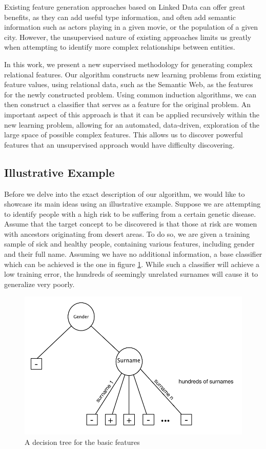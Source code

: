 \documentclass[twoside,11pt]{article}
\theoremstyle{definition}
\begin{document}
Existing feature generation approaches based on Linked Data can offer great benefits, as they can add useful type information, and often add semantic information such as actors playing in a given movie, or the population of a given city.
However, the unsupervised nature of existing approaches limits us greatly when attempting to identify more complex relationships between entities.

In this work, we present a new supervised methodology for generating complex relational features.  Our algorithm constructs new learning problems from existing feature values, using relational data, such as the Semantic Web, as the features for the newly constructed problem.
Using common induction algorithms, we can then construct a classifier that serves as a feature for the original problem. An important aspect of this approach is that it can be applied recursively within the new learning problem, allowing for an automated, data-driven, exploration of the large space of possible  complex features. This allows us to discover powerful features that an unsupervised approach would have difficulty discovering.

\subsection{Illustrative Example} 

Before we delve into the exact description of our algorithm, we would like to showcase its main ideas using an illustrative example.
Suppose we are attempting to identify people with a high risk to be suffering from a certain genetic disease. Assume that the target concept to be discovered is that those at risk are women with ancestors originating from desert areas. To do so, we are given a training sample of sick and healthy people, containing various features, including gender and their full name.
Assuming we have no additional information, a base classifier which can be achieved is the one in figure \ref{fig:tree_base}. While such a classifier will achieve a low training error, the hundreds of seemingly unrelated surnames will cause it to generalize very poorly.

\begin{figure}
	\centering
	\includegraphics[width=\linewidth]{fig1.pdf}
	\caption{A decision tree for the basic features}
	\label{fig:tree_base}
\end{figure}
\end{document}
